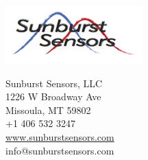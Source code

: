 \documentclass[twoside,letterpaper]{article}
\begin{document}
\begin{titlepage}
\begin{nolinenumbers}
        \begingroup
            \centering
			\begin{minipage}[b]{0.5\hsize}
			\raggedright
			\includegraphics[scale=0.8]{figs/SBlogo.jpg}
			\end{minipage}
			\noindent
			\begin{minipage}[b]{0.5\hsize}
			\raggedleft
			\small
            
			Sunburst Sensors, LLC\\
			1226 W Broadway Ave\\
			Missoula, MT 59802\\
			+1 406 532 3247\\
            \url{www.sunburstsensors.com}\\
            info@sunburstsensors.com\\
			\end{minipage}
        \endgroup
			
		\end{nolinenumbers}
\end{titlepage}
\restoregeometry

\newpage\null\thispagestyle{empty}\newpage
\newpage\null\thispagestyle{empty}\newpage

{\protect\thispagestyle{empty}}
\tableofcontents
{\protect\thispagestyle{empty}}
\cleardoublepage
\newpage\null\thispagestyle{empty}\newpage
\newpage\null\thispagestyle{empty}\newpage

\setcounter{page}{1}



\clearpage\thispagestyle{empty}

\cleardoublepage\thispagestyle{empty}

\cleardoublepage\thispagestyle{empty}

\cleardoublepage\thispagestyle{empty}

\cleardoublepage\thispagestyle{empty}

\cleardoublepage\thispagestyle{empty}

\clearpage\thispagestyle{empty}

\clearpage\thispagestyle{empty}

\clearpage\thispagestyle{empty}

\end{document}
